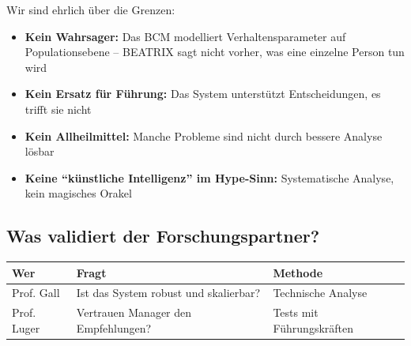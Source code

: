 \documentclass[11pt,a4paper]{article}
\begin{document}
Wir sind ehrlich über die Grenzen:

\begin{itemize}
    \item \textbf{Kein Wahrsager:} Das BCM modelliert Verhaltensparameter auf Populationsebene -- BEATRIX sagt nicht vorher, was eine einzelne Person tun wird
    \item \textbf{Kein Ersatz für Führung:} Das System unterstützt Entscheidungen, es trifft sie nicht
    \item \textbf{Kein Allheilmittel:} Manche Probleme sind nicht durch bessere Analyse lösbar
    \item \textbf{Keine ``künstliche Intelligenz'' im Hype-Sinn:} Systematische Analyse, kein magisches Orakel
\end{itemize}

\subsection{Was validiert der Forschungspartner?}

\begin{table}[h]
\centering
\begin{tabular}{@{}L{3cm}L{5cm}L{5cm}@{}}
\toprule
\textbf{Wer} & \textbf{Fragt} & \textbf{Methode} \\
\midrule
Prof. Gall & Ist das System robust und skalierbar? & Technische Analyse \\
Prof. Luger & Vertrauen Manager den Empfehlungen? & Tests mit Führungskräften \\
\bottomrule
\end{tabular}
\end{table}

\vspace{1cm}
\end{document}
